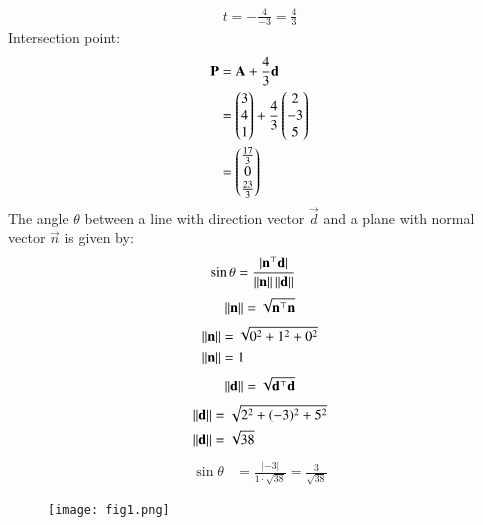 \documentclass[journal]{IEEEtran}
\begin{document}
\begin{align}
    t = -\frac{4}{-3} = \frac{4}{3}
\end{align}
Intersection point:
\begin{align}
\mathbf{P} &= \mathbf{A} + \frac{4}{3}\mathbf{d}\\
&=\begin{pmatrix}3 \\ 4 \\ 1\end{pmatrix} + \frac{4}{3}\begin{pmatrix}2 \\ -3 \\ 5\end{pmatrix}\\
&=\begin{pmatrix}\frac{17}{3} \\ 0 \\ \frac{23}{3}\end{pmatrix}
\end{align}
The angle $\theta$ between a line with direction vector $\vec{d}$ and a plane with normal vector $\vec{n}$ is given by:
\begin{align}
\sin\theta &= \frac{|\mathbf{n}^\top \mathbf{d}|}{\left\lVert\mathbf{n}\right\rVert\left\lVert\mathbf{d}\right\rVert}
\end{align}
\begin{align}
\left\lVert\mathbf{n}\right\rVert=\sqrt{\mathbf{n}^\top\mathbf{n}}
\end{align}
\begin{align}
\left\lVert\mathbf{n}\right\rVert&=\sqrt{0^2 + 1^2 + 0^2}\\
\left\lVert\mathbf{n}\right\rVert&= 1
\end{align}
\begin{align}
\left\lVert\mathbf{d}\right\rVert=\sqrt{\mathbf{d}^\top\mathbf{d}}
\end{align}
\begin{align}
\left\lVert\mathbf{d}\right\rVert&= \sqrt{2^2 + (-3)^2 + 5^2}\\
\left\lVert\mathbf{d}\right\rVert&=\sqrt{38}
\end{align}
\begin{align}
    \sin\theta &= \frac{|-3|}{1 \cdot \sqrt{38}} = \frac{3}{\sqrt{38}}
\end{align}


\begin{figure}[H]
\centering
\texttt{[image: fig1.png]}
\caption{}
\label{fig:1}
\end{figure}
\end{document}
